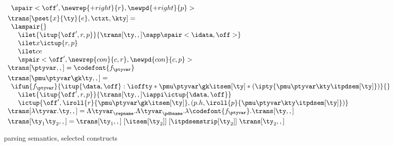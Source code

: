{\begin{figure}
\[\begin{array}{l}
\begin{array}{l}
{    \def \r {\newrep {+right}{r}}
    \def \p {\newpd {+right}{p}}
    \spair<\off',\r,\p>
  }\\ %
  \end{array}
\\[3pt]
  \trans[\pset{x}{\ty}{e},\ctxt,\kty] = \\
  \begin{array}{l}  
    \lampair{} \\
    \quad \ilet {\itup{\off',r,p}}{\trans[\ty,,] \sapp \spair<\idata,\off>} \\
    \quad \ilet x {\ictup{r,p}}\\
    \quad \ilet c e \\
    \quad \spair<\off',\newrep {con} {c,r},\newpd {con} {c,p}>
  \end{array}
\\[3pt]
\trans[\ptyvar,,] = \codefont{f_\ptyvar}
\\[3pt]
\trans[\pmu \ptyvar \gk \ty,,] = \\
  \begin{array}{l}
  \ifun {f_\ptyvar} {\itup{\data,\off} :
    \ioffty * \pmu \ptyvar \gk \itsem[\ty] 
                    * (\ipty{\pmu \ptyvar \kty \itpdsem[\ty]}) } {}\\
  \quad \ilet {\itup{\off',r,p}} 
   {\trans[\ty,,] \iappi \ictup{\data,\off}} \\ 
  \quad \ictup{\off',\iroll{r}{\pmu \ptyvar \gk \itsem[\ty]},
     (p.h,\iroll{p}{\pmu \ptyvar \kty \itpdsem[\ty]})}
  \end{array}  
\\[3pt]
\trans[\lambda\tyvar . \ty,,] = %
    \Lambda \tyvar_\repname. 
    \Lambda \tyvar_\pdbname. \lambda \codefont{f_\ptyvar}. \trans[\ty,,]
\\[3pt]
\trans[\ty_1 \ty_2,,] = 
    \trans[\ty_1,,]\; [\itsem[\ty_2]]\; [\itpdsemstrip[\ty_2]]\; \trans[\ty_2,,]
\\
\end{array}
\]
\caption{\ddc{} parsing semantics, selected constructs}
\label{fig:ddc-sem-sum}
\end{figure}


}
